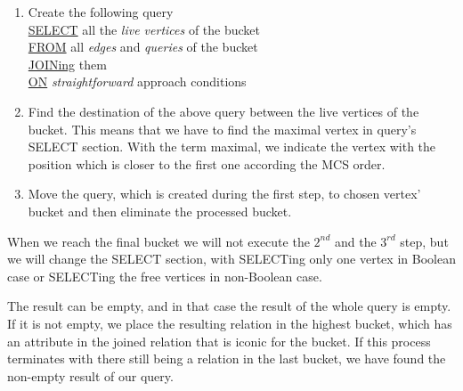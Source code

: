 \begin{enumerate}
\item Create the following query \\
\underline{SELECT} all the \emph{live vertices} of the bucket \\
\underline{FROM} all \emph{edges} and \emph{queries} of the bucket\\
\underline{JOINing} them \\
\underline{ON} \emph{straightforward} approach conditions
\item Find the destination of the above query between the live vertices of the bucket. This means that we have to find the maximal vertex in query's  SELECT section. With the term maximal, we indicate the vertex with the position which is closer to the first one according the MCS order. 
\item Move the query, which is created during the first step, to chosen vertex' bucket and then eliminate the processed bucket.
\end{enumerate}

When we reach the final bucket we will not execute the $2^{nd}$ and the $3^{rd}$ step, but we will change the SELECT section, with SELECTing only one vertex in Boolean case or SELECTing the free vertices in non-Boolean case.

The result can be empty, and in that case the result of the whole query is empty. If it is not empty, we place the resulting relation in the highest bucket, which has an attribute in the joined relation that is iconic for the bucket. If this process terminates with there still being a relation in the last bucket, we have found the non-empty result of our query.
